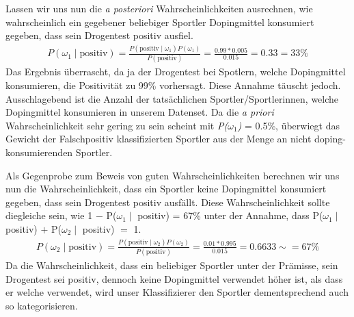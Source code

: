 Lassen wir uns nun die \textit{a posteriori} Wahrscheinlichkeiten ausrechnen, wie wahrscheinlich ein gegebener beliebiger Sportler Dopingmittel konsumiert gegeben, dass
sein Drogentest positiv ausfiel.
\begin{align*}	
	P(\omega_1\mid \text{positiv}) = \frac{P(\text{positiv}\mid \omega_1)P(\omega_1)}{P(\text{positiv})} = \frac{0.99 * 0.005}{0.015} = 0.33 = 33\%
\end{align*}
Das Ergebnis überrascht, da ja der Drogentest bei Spotlern, welche Dopingmittel konsumieren, die Positivität zu 99\% vorhersagt. Diese Annahme täuscht jedoch.
Ausschlagebend ist die Anzahl der tatsächlichen Sportler/Sportlerinnen, welche Dopingmittel konsumieren in unserem Datenset. Da die \textit{a priori} Wahrscheinlichkeit sehr gering
zu sein scheint mit \textit{P($\omega_1$)} = 0.5\%, überwiegt das Gewicht der Falschpositiv klassifizierten Sportler aus der Menge an nicht doping-konsumierenden Sportler.

Als Gegenprobe zum Beweis von guten Wahrscheinlichkeiten berechnen wir uns nun die Wahrscheinlichkeit, dass ein Sportler keine Dopingmittel konsumiert gegeben, dass sein Drogentest
positiv ausfällt. Diese Wahrscheinlichkeit sollte diegleiche sein, wie 1 $-$ P($\omega_1\mid$ positiv) = 67\% unter der Annahme, dass P($\omega_1\mid$ positiv) $+$ P($\omega_2\mid$ positiv) $=$ 1.
\begin{align*}	
	P(\omega_2\mid \text{positiv}) = \frac{P(\text{positiv}\mid \omega_2)P(\omega_2)}{P(\text{positiv})} = \frac{0.01 * 0.995}{0.015} = 0.6633 \sim= 67\%
\end{align*}
Da die Wahrscheinlichkeit, dass ein beliebiger Sportler
unter der Prämisse, sein Drogentest sei positiv, dennoch keine Dopingmittel verwendet höher ist, als dass er welche verwendet, wird unser Klassifizierer den Sportler dementsprechend auch so kategorisieren. 